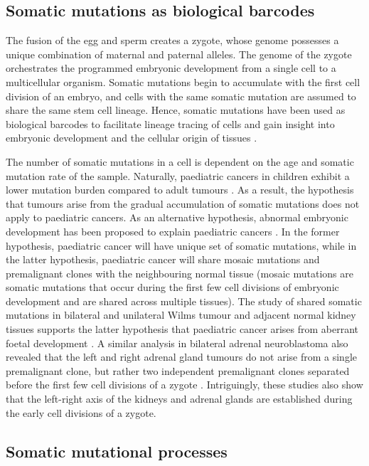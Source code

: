 \subsection{Somatic mutations as biological barcodes}

The fusion of the egg and sperm creates a zygote, whose genome possesses a unique combination of maternal and paternal alleles. The genome of the zygote orchestrates the programmed embryonic development from a single cell to a multicellular organism. Somatic mutations begin to accumulate with the first cell division of an embryo, and cells with the same somatic mutation are assumed to share the same stem cell lineage. Hence, somatic mutations have been used as biological barcodes to facilitate lineage tracing of cells and gain insight into embryonic development and the cellular origin of tissues \cite{Behjati2014-gb}.

The number of somatic mutations in a cell is dependent on the age and somatic mutation rate of the sample. Naturally, paediatric cancers in children exhibit a lower mutation burden compared to adult tumours \cite{Grobner2018-ve}. As a result, the hypothesis that tumours arise from the gradual accumulation of somatic mutations does not apply to paediatric cancers. As an alternative hypothesis, abnormal embryonic development has been proposed to explain paediatric cancers \cite{Marshall2014-ec}. In the former hypothesis, paediatric cancer will have unique set of somatic mutations, while in the latter hypothesis, paediatric cancer will share mosaic mutations and premalignant clones with the neighbouring normal tissue (mosaic mutations are somatic mutations that occur during the first few cell divisions of embryonic development and are shared across multiple tissues). The study of shared somatic mutations in bilateral and unilateral Wilms tumour and adjacent normal kidney tissues supports the latter hypothesis that paediatric cancer arises from aberrant foetal development \cite{Coorens2019-zf}. A similar analysis in bilateral adrenal neuroblastoma also revealed that the left and right adrenal gland tumours do not arise from a single premalignant clone, but rather two independent premalignant clones separated before the first few cell divisions of a zygote \cite{Coorens2020-ut}. Intriguingly, these studies also show that the left-right axis of the kidneys and adrenal glands are established during the early cell divisions of a zygote. 

\subsection{Somatic mutational processes}
\label{sec:mutational_signature_analysis}

